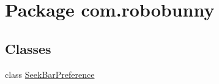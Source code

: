 \hypertarget{namespacecom_1_1robobunny}{\section{\-Package com.\-robobunny}
\label{namespacecom_1_1robobunny}
}
\subsection*{\-Classes}
\begin{DoxyCompactItemize}
\item 
class \hyperlink{classcom_1_1robobunny_1_1_seek_bar_preference}{\-Seek\-Bar\-Preference}
\end{DoxyCompactItemize}

